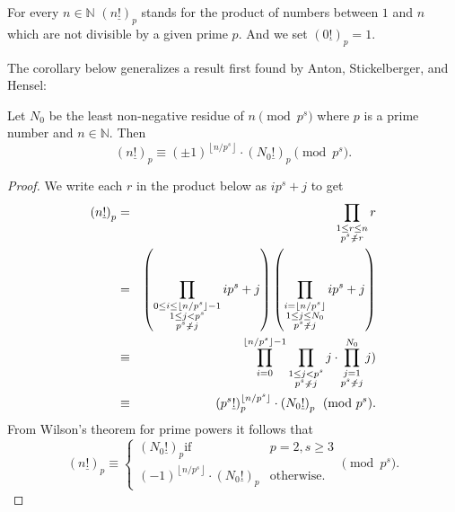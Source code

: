 \documentclass[12pt]{article}
\newcommand{\pfac}[1]{\left(#1\underline{!}\right)_p}
\begin{document}
For every $n \in \mathbb{N}$ $\pfac{n}$ stands for the product of numbers
between $1$ and $n$ which are not divisible by a given prime $p$. And we set
$\pfac{0} =1$.

The corollary below generalizes a result first found by Anton, Stickelberger,
and Hensel:

Let $N_0$ be the least non-negative residue of $n \pmod{p^s}$ where $p$ is a
prime number and $n \in \mathbb{N}$. Then
\begin{displaymath}
\pfac{n} \equiv \left(\pm 1\right)^{\left\lfloor n/p^s
\right\rfloor}\cdot \pfac{N_0} \pmod{p^s}.
\end{displaymath}

\begin{proof}
We write each $r$ in the product below as $ip^s +j$ to get
\begin{eqnarray*}
\pfac{n} &=& \prod\limits_{\substack{1 \le r \le n\\ p^s \not\div r}} r \\ &=&\left( 
\prod\limits_{\substack{0 \le i \le \left\lfloor n/p^s\right\rfloor -1 \\ 1 \le j < p^s \\ p^s
\not\div j}} ip^s +j\right)\left( \prod\limits_{\substack{i=\left\lfloor
n/p^s\right\rfloor \\ 1\le j \le N_0 \\ p^s \not\div j}} ip^s +j\right) \\
 &\equiv& \prod\limits_{i=0}^{\left\lfloor n/p^s \right\rfloor -1}
\prod\limits_{\substack{1 \le j < p^s \\ p^s \not\div j }} j\cdot
	\prod\limits_{\substack{j=1 \\ p^s \not\div j}}^{N_0} j) \\
 &\equiv&
\pfac{p^s}^{\left\lfloor n/p^s\right\rfloor}\cdot \pfac{N_0} \pmod{p^s}.
\end{eqnarray*}
From Wilson's theorem for prime powers it follows that
\begin{displaymath}
\pfac{n} \equiv
\begin{cases} 
\pfac{N_0} \text{if} & p=2, s \ge 3 \\
(-1)^{\left\lfloor n/p^s\right\rfloor}\cdot\pfac{N_0} & \text{otherwise.}
\end{cases} \pmod{p^s}.
\end{displaymath}
\end{proof}
\end{document}
